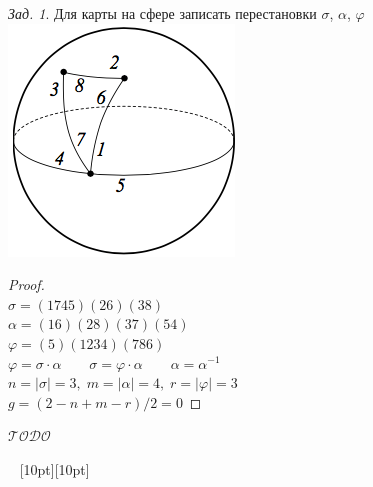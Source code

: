 \documentclass[a4paper,12pt]{article}
\numberwithin{figure}{section}
\theoremstyle{remark}
\newtheorem{problem}{Зад.}[section]
\def\iiTODO{\guillemotleft$\mathcal{TODO}$\guillemotright\textellipsis}
\begin{document}
\begin{problem}
	Для карты на сфере записать перестановки $\sigma$, $\alpha$, $\varphi$
	\\ \includegraphics{permutations-on-sphere.png}
\end{problem}
\begin{proof}
	\ \\
	$\sigma = (1 7 4 5) (2 6) (3 8)$ \\
	$\alpha = (1 6) (2 8) (3 7) (5 4)$ \\
	$\varphi = (5) (1 2 3 4) (7 8 6)$ \\
	$\varphi = \sigma \cdot \alpha \qquad \sigma = \varphi \cdot \alpha \qquad \alpha = \alpha^{-1}$ \\
	$n=|\sigma|=3 ,\; m=|\alpha|=4 ,\; r=|\varphi|=3$ \\
	$g = (2-n+m-r)/2 = 0$  
\end{proof}


\iiTODO




\vspace{48pt} \noindent \hrulefill~ \raisebox{-8pt}[10pt][10pt]{\Huge{}}~ \hrulefill
\end{document}
